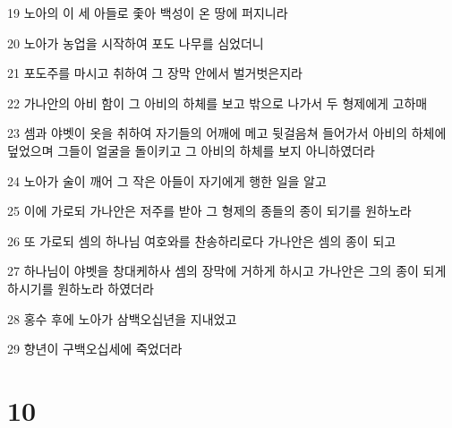 \par 19 노아의 이 세 아들로 좇아 백성이 온 땅에 퍼지니라
\par 20 노아가 농업을 시작하여 포도 나무를 심었더니
\par 21 포도주를 마시고 취하여 그 장막 안에서 벌거벗은지라
\par 22 가나안의 아비 함이 그 아비의 하체를 보고 밖으로 나가서 두 형제에게 고하매
\par 23 셈과 야벳이 옷을 취하여 자기들의 어깨에 메고 뒷걸음쳐 들어가서 아비의 하체에 덮었으며 그들이 얼굴을 돌이키고 그 아비의 하체를 보지 아니하였더라
\par 24 노아가 술이 깨어 그 작은 아들이 자기에게 행한 일을 알고
\par 25 이에 가로되 가나안은 저주를 받아 그 형제의 종들의 종이 되기를 원하노라
\par 26 또 가로되 셈의 하나님 여호와를 찬송하리로다 가나안은 셈의 종이 되고
\par 27 하나님이 야벳을 창대케하사 셈의 장막에 거하게 하시고 가나안은 그의 종이 되게 하시기를 원하노라 하였더라
\par 28 홍수 후에 노아가 삼백오십년을 지내었고
\par 29 향년이 구백오십세에 죽었더라

\chapter{10}

